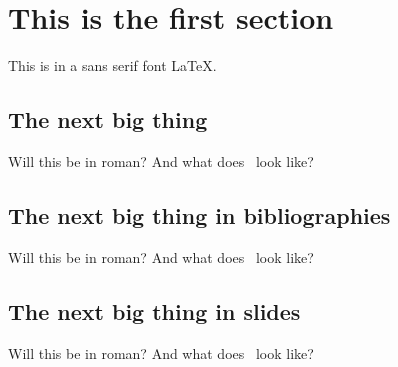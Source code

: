 \documentclass{article}
\begin{document}
\rm

\section{This is the first section}

\sf This is in a sans serif font \LaTeX.

\subsection{The next big thing}

Will this be in roman?  And what does \LaTeXe\ look like?

\subsection{The next big thing in bibliographies}

Will this be in roman?  And what does \BibTeX\ look like?

\subsection{The next big thing in slides}

Will this be in roman?  And what does \SLiTeX\ look like?
\end{document}
